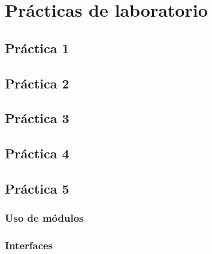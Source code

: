 \section{Prácticas de laboratorio}
	\subsection{Práctica 1}
	
	\newpage
	\subsection{Práctica 2}
	
	\newpage
	\subsection{Práctica 3}
	
    \newpage
	\subsection{Práctica 4}
    
    \newpage
    
    \newpage
	\subsection{Práctica 5}
	\subsubsection{Uso de módulos}
	
	
	\subsubsection{Interfaces}
	
	
	
	
	
	
